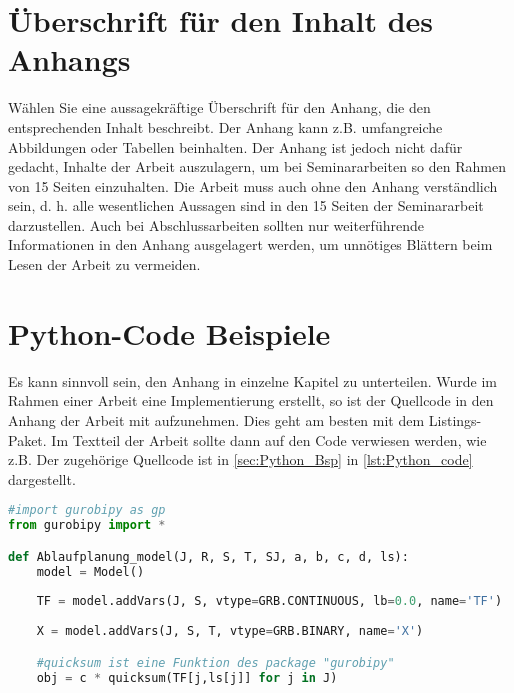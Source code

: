 %
%
\begin{appendix}
\section{Überschrift für den Inhalt des Anhangs}
Wählen Sie eine aussagekräftige Überschrift für den Anhang, die den entsprechenden Inhalt beschreibt. Der Anhang kann z.B. umfangreiche Abbildungen oder Tabellen beinhalten. Der Anhang ist jedoch nicht dafür gedacht, Inhalte der Arbeit auszulagern, um bei Seminararbeiten so den Rahmen von 15 Seiten einzuhalten. Die Arbeit muss auch ohne den Anhang verständlich sein, d. h. alle wesentlichen Aussagen sind in den 15 Seiten der Seminararbeit darzustellen. Auch bei Abschlussarbeiten sollten nur weiterführende Informationen in den Anhang ausgelagert werden, um unnötiges Blättern beim Lesen der Arbeit zu vermeiden.

\newpage
\section{Python-Code Beispiele} \label{sec:Python_Bsp}
Es kann sinnvoll sein, den Anhang in einzelne Kapitel zu unterteilen. Wurde im Rahmen einer Arbeit eine Implementierung erstellt, so ist der Quellcode in den Anhang der Arbeit mit aufzunehmen. Dies geht am besten mit dem Listings-Paket. Im Textteil der Arbeit sollte dann auf den Code verwiesen werden, wie z.B. \glqq Der zugehörige Quellcode ist in \autoref{sec:Python_Bsp} in \autoref{lst:Python_code} dargestellt\grqq.

\begin{lstlisting}[language=Python, caption={Hier kann eine Überschrift eingefügt werden, die den Code beschreibt}, label={lst:Python_code}] 
#import gurobipy as gp
from gurobipy import *

def Ablaufplanung_model(J, R, S, T, SJ, a, b, c, d, ls):
    model = Model()
    
    TF = model.addVars(J, S, vtype=GRB.CONTINUOUS, lb=0.0, name='TF')
    
    X = model.addVars(J, S, T, vtype=GRB.BINARY, name='X')

    #quicksum ist eine Funktion des package "gurobipy"
    obj = c * quicksum(TF[j,ls[j]] for j in J)


\end{lstlisting}
\end{appendix}
